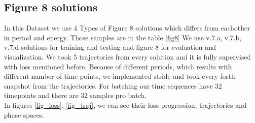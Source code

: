 \subsection{Figure 8 solutions}
In this Dataset we use 4 Types of Figure 8 solutions which differs from eachother in period and energy. Those samples are in the table \ref{fig8} We use v.7.a, v.7.b, v.7.d solutions for training and testing and figure 8 for evaluation and visualization. We took 5 trajectories from every solution and it is fully supervised with loss mentioned before. Because of different periods, which results with different number of time points, we implemented stride and took every forth snapshot from the trajectories. For batching our time sequences have 32 timepoints and there are 32 samples pro batch. \\
In figures \ref{fig_loss}, \ref{fig_traj}, we can see their loss progression, trajectories and phase spaces.

